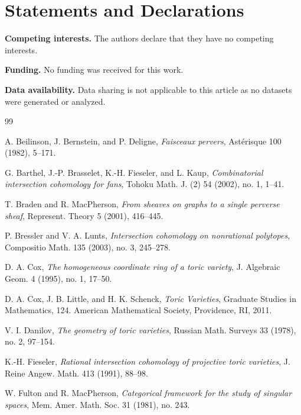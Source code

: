 \documentclass[12pt,reqno]{amsart}
\theoremstyle{plain}
\theoremstyle{definition}
\begin{document}
	\section*{Statements and Declarations}
	
	\noindent\textbf{Competing interests.}
	The authors declare that they have no competing interests.
	
	\noindent\textbf{Funding.}
	No funding was received for this work.
	
	\noindent\textbf{Data availability.}
	Data sharing is not applicable to this article as no datasets were generated or analyzed.
	
	\begin{thebibliography}{99}
		
		A. Beilinson, J. Bernstein, and P. Deligne,
		\textit{Faisceaux pervers},
		Ast\'erisque 100 (1982), 5--171.
		
		G. Barthel, J.-P. Brasselet, K.-H. Fieseler, and L. Kaup,
		\textit{Combinatorial intersection cohomology for fans},
		Tohoku Math. J. (2) 54 (2002), no. 1, 1--41.
		
		T. Braden and R. MacPherson,
		\textit{From sheaves on graphs to a single perverse sheaf},
		Represent. Theory 5 (2001), 416--445.
		
		P. Bressler and V. A. Lunts,
		\textit{Intersection cohomology on nonrational polytopes},
		Compositio Math. 135 (2003), no. 3, 245--278.
		
		D. A. Cox,
		\textit{The homogeneous coordinate ring of a toric variety},
		J. Algebraic Geom. 4 (1995), no. 1, 17--50.
		
		D. A. Cox, J. B. Little, and H. K. Schenck,
		\textit{Toric Varieties},
		Graduate Studies in Mathematics, 124. American Mathematical Society, Providence, RI, 2011.
		
		V. I. Danilov,
		\textit{The geometry of toric varieties},
		Russian Math. Surveys 33 (1978), no. 2, 97--154.
		
		K.-H. Fieseler,
		\textit{Rational intersection cohomology of projective toric varieties},
		J. Reine Angew. Math. 413 (1991), 88--98.
		
		W. Fulton and R. MacPherson,
		\textit{Categorical framework for the study of singular spaces},
		Mem. Amer. Math. Soc. 31 (1981), no. 243.
		

\end{thebibliography}
\end{document}
